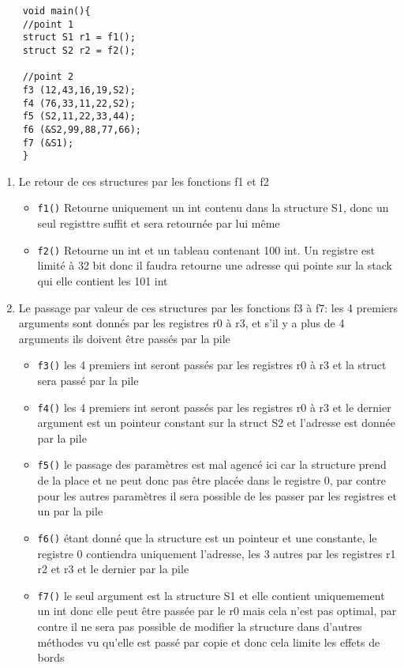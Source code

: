 \begin{lstlisting}
    void main(){
    //point 1
    struct S1 r1 = f1();
    struct S2 r2 = f2();

    //point 2
    f3 (12,43,16,19,S2);
    f4 (76,33,11,22,S2);
    f5 (S2,11,22,33,44);
    f6 (&S2,99,88,77,66);
    f7 (&S1);
    }   
\end{lstlisting}

\begin{enumerate}
    \item Le retour de ces structures par les fonctions f1 et f2
       \begin{itemize}
          \item \texttt{f1()} Retourne uniquement un int contenu dans la structure S1, donc un seul registtre suffit et sera retournée par lui même
          \item \texttt{f2()} Retourne un int et un tableau contenant 100 int. Un registre est limité à 32 bit donc il faudra retourne une adresse qui pointe sur la stack qui elle contient les 101 int
       \end{itemize}
    \item Le passage par valeur de ces structures par les fonctions f3 à f7: les 4 premiers arguments sont donnés par les registres r0 à r3, et s'il y a plus de 4 arguments ils doivent être passés par la pile
       \begin{itemize}
          \item \texttt{f3()} les 4 premiers int seront passés par les registres r0 à r3 et la struct sera passé par la pile
          \item \texttt{f4()} les 4 premiers int seront passés par les registres r0 à r3 et le dernier argument est un pointeur constant sur la struct S2 et l'adresse est donnée par la pile

          \item \texttt{f5()} le passage des paramètres est mal agencé ici car la structure prend de la place et ne peut donc pas être placée dans le registre 0, par contre pour les autres paramètres il sera possible de les passer par les registres et un par la pile

          \item \texttt{f6()} étant donné que la structure est un pointeur et une constante, le registre 0 contiendra uniquement l'adresse, les 3 autres par les registres r1 r2 et r3 et le dernier par la pile

          \item \texttt{f7()} le seul argument est la structure S1 et elle contient uniquemement un int donc elle peut être passée par le r0 mais cela n'est pas optimal, par contre il ne sera pas possible de modifier la structure dans d'autres méthodes vu qu'elle est passé par copie et donc cela limite les effets de bords
       \end{itemize}
\end{enumerate}

